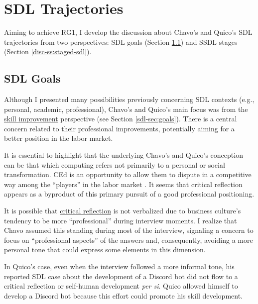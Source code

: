 \section{SDL Trajectories}
\label{disc-sec:sdl-trajectories}

Aiming to achieve \gls{RG}1, I develop the discussion about Chavo's and Quico's \gls{SDL} trajectories from two perspectives: \gls{SDL} goals (Section \ref{disc-ss:sdl-goals}) and \acrfull{SSDL} stages (Section \ref{disc-ss:staged-sdl}).

\subsection{SDL Goals}
\label{disc-ss:sdl-goals}

Although I presented many possibilities previously concerning \gls{SDL} contexts (e.g., personal, academic, professional), Chavo's and Quico's main focus was from the \underline{skill improvement} perspective (see Section \ref{sdl-sec:goals}). There is a central concern related to their professional improvements, potentially aiming for a better position in the labor market.

It is essential to highlight that the underlying Chavo's and Quico's conception can be that which computing refers not primarily to a personal or social transformation. \acrfull{CEd} is an opportunity to allow them to dispute in a competitive way among the ``players'' in the labor market \cite[p.~428]{bispojr:2024-nmp}. It seems that critical reflection appears as a byproduct of this primary pursuit of a good professional positioning.

It is possible that \underline{critical reflection} is not verbalized due to business culture's tendency to be more ``professional'' during interview moments. I realize that Chavo assumed this standing during most of the interview, signaling a concern to focus on ``professional aspects'' of the answers and, consequently, avoiding a more personal tone that could express some elements in this dimension.

In Quico's case, even when the interview followed a more informal tone, his reported \gls{SDL} case about the development of a Discord bot did not flow to a critical reflection or self-human development \textit{per si}. Quico allowed himself to develop a Discord bot because this effort could promote his skill development.

